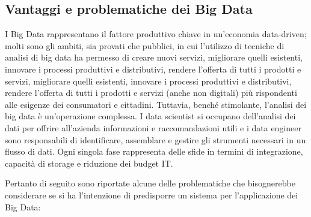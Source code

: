 \subsection{Vantaggi e problematiche dei Big Data}

I Big Data rappresentano il fattore produttivo chiave in un’economia data-driven; molti sono gli ambiti, sia provati che pubblici, in cui l’utilizzo di tecniche di analisi di big data ha permesso di creare nuovi servizi, migliorare quelli esistenti, innovare i processi produttivi e distributivi, rendere l’offerta di tutti i prodotti e servizi, migliorare quelli esistenti, innovare i processi produttivi e distributivi, rendere l’offerta di tutti i prodotti e servizi (anche non digitali) più rispondenti alle esigenze dei consumatori e cittadini. Tuttavia, benché stimolante, l’analisi dei big data è un’operazione complessa. I data scientist si occupano dell’analisi dei dati per offrire all’azienda informazioni e raccomandazioni utili e i data engineer sono responsabili di identificare, assemblare e gestire gli strumenti necessari in un flusso di dati. Ogni singola fase rappresenta delle sfide in termini di integrazione, capacità di storage e riduzione dei budget IT.\cite{redhat_big_data}

Pertanto di seguito sono riportate alcune delle problematiche che bisognerebbe considerare se si ha l’intenzione di predisporre un sistema per l’applicazione dei Big Data\cite{microsoft_big_data}:

